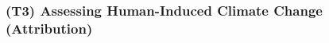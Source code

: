 \documentclass[11pt]{article}
\newcommand\citep{\cite}
\begin{document}



\subsubsection{(T3) Assessing Human-Induced Climate Change (Attribution)} \label{sec:T3}
\end{document}
